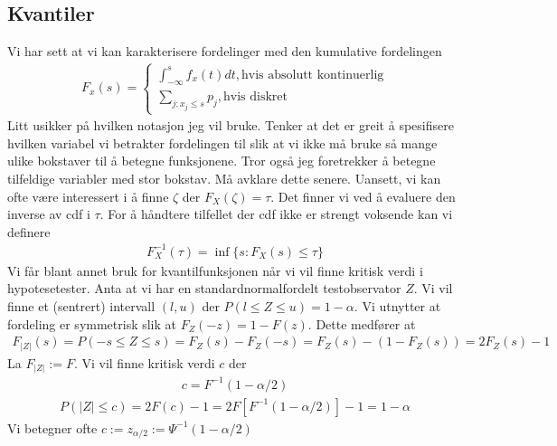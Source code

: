 \subsection{Kvantiler}
Vi har sett at vi kan karakterisere fordelinger med den kumulative fordelingen
\begin{align}
F_x(s)= 
\begin{cases}
\int_{-\infty}^s f_x(t)dt, \text{hvis absolutt kontinuerlig}\\
\sum_{j:x_j\leq s} p_j, \text{hvis diskret}
\end{cases}
\end{align}
Litt usikker på hvilken notasjon jeg vil bruke. Tenker at det er greit å spesifisere hvilken variabel vi betrakter fordelingen til slik at vi ikke må bruke så mange ulike bokstaver til å betegne funksjonene. Tror også jeg foretrekker å betegne tilfeldige variabler med stor bokstav. Må avklare dette senere. Uansett, vi kan ofte være interessert i å finne $\zeta$ der $F_X(\zeta) = \tau$. Det finner vi ved å evaluere den inverse av cdf i $\tau$. For å håndtere tilfellet der cdf ikke er strengt voksende kan vi definere
\begin{align}
F_X^{-1}(\tau)=\inf \{s:F_X(s)\leq \tau\}
\end{align}
Vi får blant annet bruk for kvantilfunksjonen når vi vil finne kritisk verdi i hypotesetester. Anta at vi har en standardnormalfordelt testobservator $Z$. Vi vil finne et (sentrert) intervall $(l,u)$ der $P(l\leq Z \leq u)=1-\alpha$. Vi utnytter at fordeling er symmetrisk slik at $F_Z(-z)= 1-F(z)$. Dette medfører at 
\begin{align}
F_{|Z|}(s)=P(-s\leq Z \leq s)= F_Z(s)-F_Z(-s)=F_Z(s)-(1-F_Z(s))=2F_Z(s)-1
\end{align}
La $F_{|Z|} := F$. Vi vil finne kritisk verdi $c$ der
\begin{align}
c = F^{-1}(1-\alpha/2) 
\end{align}
\begin{align}
P(|Z| \leq c) = 2F(c)-1 = 2F[F^{-1}(1-\alpha/2)]-1 = 1-\alpha
\end{align}
Vi betegner ofte $c := z_{\alpha/2}:=\Psi^{-1}(1-\alpha/2)$
